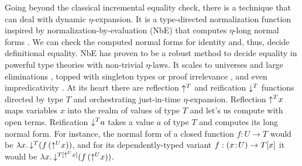 \documentclass[acmlarge,review,anonymous]{acmart}\settopmatter{printfolios=true}
\begin{document}
Going beyond the classical incremental equality check, there is a technique that can deal with dynamic $\eta$-expansion.  It is a type-directed normalization function inspired by normalization-by-evaluation (NbE) that computes $\eta$-long normal forms \cite{bergerSchwichtenberg:lics91,danvy:tdpe}.  We can check the computed normal forms for identity and, thus, decide definitional equality.
NbE has proven to be a robust method to decide equality in powerful type theories with non-trivial $\eta$-laws.  It scales to universes and large eliminations \cite{abelCoquandDybjer:lics07}, topped with singleton types or proof irrelevance \cite{abelCoquandPagano:lmcs11}, and even impredicativity \cite{abel:flops10}.  At its heart there are reflection $\mathord{\uparrow^{T}}$ and reification $\mathord{\downarrow^{T}}$ functions directed by type $T$ and orchestrating just-in-time $\eta$-expansion.  Reflection $\mathord{\uparrow^{T}} x$ maps variables $x$ into the realm of values of type $T$ and let's us compute with open terms.  Reification $\mathord{\downarrow^{T}} a$ takes a value $a$ of type $T$ and computes its long normal form.  For instance, the normal form of a closed function $f : U \to T$ would be $\lambda x.\,\mathord{\downarrow^{T}} (f\,(\mathord{\uparrow^{U}} x))$, and for its dependently-typed variant $f : (x \!:\! U) \to T[x]$ it would be $\lambda x.\,\mathord{\downarrow^{T[\mathord{\uparrow^{U}} x]}} (f\,(\mathord{\uparrow^{U}} x))$.

\end{document}
